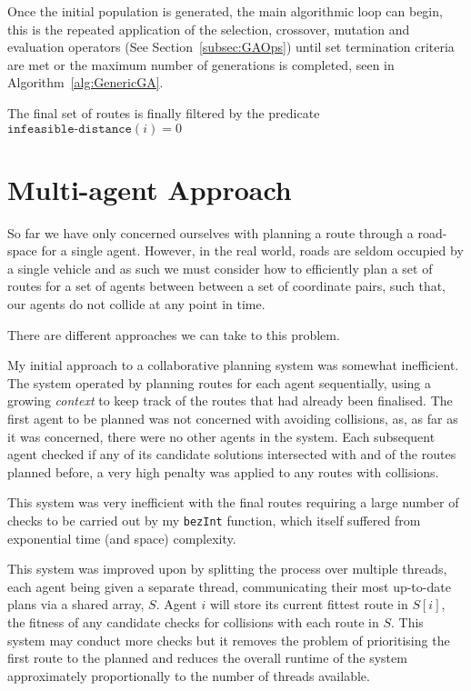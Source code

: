 Once the initial population is generated, the main algorithmic loop can begin, this is the repeated application of the selection, crossover, mutation and evaluation operators (See Section~\ref{subsec:GAOps}) until set termination criteria are met or the maximum number of generations is completed, seen in Algorithm~\ref{alg:GenericGA}.

The final set of routes is finally filtered by the predicate $\texttt{infeasible-distance}(i) = 0 $

\section{Multi-agent Approach}

So far we have only concerned ourselves with planning a route through a road-space for a single agent. However, in the real world, roads are seldom occupied by a single vehicle and as such we must consider how to efficiently plan a set of routes for a set of agents between between a set of coordinate pairs, such that, our agents do not collide at any point in time.

There are different approaches we can take to this problem. 

My initial approach to a collaborative planning system was somewhat inefficient. The system operated by planning routes for each agent sequentially, using a growing \textit{context} to keep track of the routes that had already been finalised. The first agent to be planned was not concerned with avoiding collisions, as, as far as it was concerned, there were no other agents in the system. Each subsequent agent checked if any of its candidate solutions intersected with and of the routes planned before, a very high penalty was applied to any routes with collisions.

This system was very inefficient with the final routes requiring a large number of checks to be carried out by my \texttt{bezInt} function, which itself suffered from  exponential time (and space) complexity.

This system was improved upon by splitting the process over multiple threads, each agent being given a separate thread, communicating their most up-to-date plans via a shared array, $S$. Agent $i$ will store its current fittest route in $S[i]$, the fitness of any candidate checks for collisions with each route in $S$. This system may conduct more checks but it removes the problem of prioritising the first route to the planned and reduces the overall runtime of the system approximately proportionally to the number of threads available.

